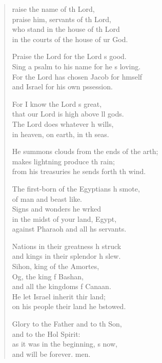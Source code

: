 \begin{verse}
  \begin{patverse}
raise the name of th Lord,\Med\\
praise him, servants of th Lord,\\
who stand in the house of th Lord\Med\\
in the courts of the house of ur God.

Praise the Lord for the Lord \pointup{\i}s good.\Med\\
Sing a psalm to his name for he \pointup{\i}s loving.\\
For the Lord has chosen Jacob for h\pointup{\i}mself\Med\\
and Israel for his own pssession.

For I know the Lord \pointup{\i}s great,\Med\\
that our Lord is high above ll gods.\\
The Lord does whatever h wills,\Med\\
in heaven, on earth, in th seas.

He summons clouds from the ends of the arth;\Flex\\
makes lightning produce th rain;\Med\\
from his treasuries he sends forth th wind.

The first-born of the Egyptians h smote,\Med\\
of man and beast like.\\
Signs and wonders he wrked\Flex\\
in the midst of your land,  Egypt,\Med\\
against Pharaoh and all h\pointup{\i}s servants.

Nations in their greatness h struck\Med\\
and kings in their splendor h slew.\\
Sihon, king of the Amor\pointup{\i}tes,\Flex\\
Og, the king f Bashan,\Med\\
and all the kingdoms f Canaan.\\
He let Israel inherit thir land;\Med\\
on his people their land he bstowed.

Glory to the Father and to th Son,\Med\\
and to the Hol Spirit:\\
as it was in the beginning, \pointup{\i}s now,\Med\\
and will be forever. men.
  \end{patverse}
\end{verse}
